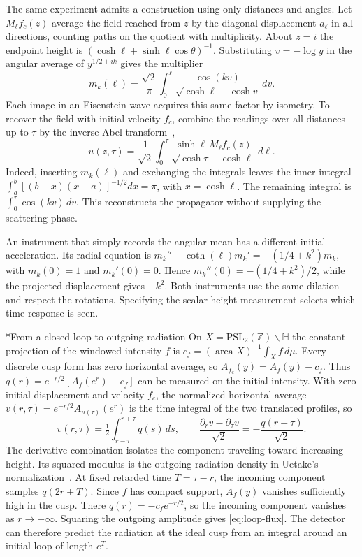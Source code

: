 \documentclass[11pt,letterpaper]{article}
\makeatletter
\renewcommand\subsection{\@startsection{subsection}{2}{\z@}{-2.0ex plus -.3ex}{.75ex}{\normalfont\normalsize\itshape}}
\numberwithin{equation}{section}
\makeatother
\begin{document}
The same experiment admits a construction using only distances and angles. Let $M_\ell f_c(z)$ average the field reached from $z$ by the diagonal displacement $a_\ell$ in all directions, counting paths on the quotient with multiplicity. About $z=i$ the endpoint height is $(\cosh\ell+\sinh\ell\cos\theta)^{-1}$. Substituting $v=-\log y$ in the angular average of $y^{1/2+ik}$ gives the multiplier
\[
 m_k(\ell)=\frac{\sqrt2}{\pi}\int_0^\ell
               \frac{\cos(kv)}{\sqrt{\cosh\ell-\cosh v}}\,dv .
\]
Each image in an Eisenstein wave acquires this same factor by isometry. To recover the field with initial velocity $f_c$, combine the readings over all distances up to $\tau$ by the inverse Abel transform~\cite{abelwave},
\[
 u(z,\tau)=\frac1{\sqrt2}\int_0^\tau
       \frac{\sinh\ell\,M_\ell f_c(z)}{\sqrt{\cosh\tau-\cosh\ell}}\,d\ell .
\]
Indeed, inserting $m_k(\ell)$ and exchanging the integrals leaves the inner integral $\int_a^b[(b-x)(x-a)]^{-1/2}dx=\pi$, with $x=\cosh\ell$. The remaining integral is $\int_0^\tau\cos(kv)\,dv$. This reconstructs the propagator without supplying the scattering phase.

An instrument that simply records the angular mean has a different initial acceleration. Its radial equation is $m_k''+\coth(\ell)m_k'=-(1/4+k^2)m_k$, with $m_k(0)=1$ and $m_k'(0)=0$. Hence $m_k''(0)=-(1/4+k^2)/2$, while the projected displacement gives $-k^2$. Both instruments use the same dilation and respect the rotations. Specifying the scalar height measurement selects which time response is seen.

\subsection*{From a closed loop to outgoing radiation}\label{app:loop-flux}
On $X=\mathrm{PSL}_2(\mathbb Z)\backslash\mathbb H$ the constant projection of the windowed intensity $f$ is $c_f=(\operatorname{area}X)^{-1}\int_X f\,d\mu$. Every discrete cusp form has zero horizontal average, so $A_{f_c}(y)=A_f(y)-c_f$. Thus $q(r)=e^{-r/2}[A_f(e^r)-c_f]$ can be measured on the initial intensity. With zero initial displacement and velocity $f_c$, the normalized horizontal average $v(r,\tau)=e^{-r/2}A_{u(\tau)}(e^r)$ is the time integral of the two translated profiles, so
\[
 v(r,\tau)=\tfrac12\int_{r-\tau}^{r+\tau}q(s)\,ds,\qquad
 \frac{\partial_r v-\partial_\tau v}{\sqrt2}
       =-\frac{q(r-\tau)}{\sqrt2}.
\]
The derivative combination isolates the component traveling toward increasing height. Its squared modulus is the outgoing radiation density in Uetake's normalization~\cite[\S5, p.~115]{uetake}. At fixed retarded time $T=\tau-r$, the incoming component samples $q(2r+T)$. Since $f$ has compact support, $A_f(y)$ vanishes sufficiently high in the cusp. There $q(r)=-c_f e^{-r/2}$, so the incoming component vanishes as $r\to+\infty$. Squaring the outgoing amplitude gives \eqref{eq:loop-flux}. The detector can therefore predict the radiation at the ideal cusp from an integral around an initial loop of length $e^T$.
\end{document}
